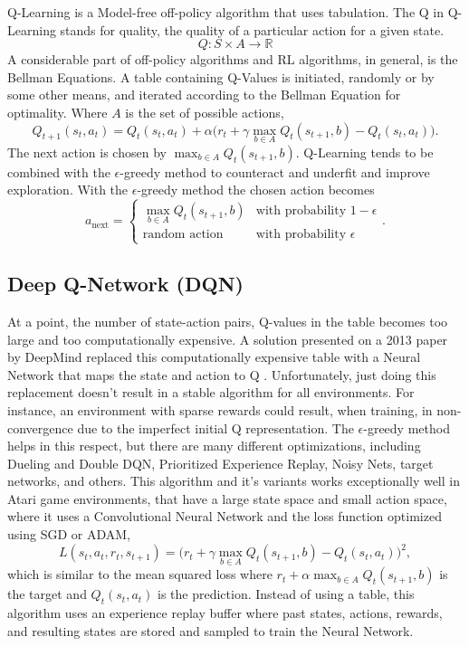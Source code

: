 Q-Learning is a Model-free off-policy algorithm that uses tabulation. The Q in Q-Learning stands for quality, the quality of a particular action for a given state. $$Q:S\times A\rightarrow \mathbb{R}$$ A considerable part of off-policy algorithms and RL algorithms, in general, is the Bellman Equations. A table containing Q-Values is initiated, randomly or by some other means, and iterated according to the Bellman Equation for optimality. Where $A$ is the set of possible actions, 
\begin{equation}\label{eq:qupdate}
	Q_{t+1}(s_t, a_t)=Q_t(s_t, a_t)+\alpha \big(r_t+\gamma\max_{b\in A} Q_t(s_{t+1},b)-Q_t(s_t,a_t)\big).
\end{equation}
 The next action is chosen by $\max_{b\in A} Q_t(s_{t+1},b)$. Q-Learning tends to be combined with the $\epsilon$-greedy method to counteract and underfit and improve exploration. With the $\epsilon$-greedy method the chosen action becomes $$a_{\text{next}}=\begin{cases}\max_{b\in A} Q_t(s_{t+1},b) & \text{with probability }1-\epsilon \\ \text{random action}  & \text{with probability }\epsilon\end{cases}.$$

\subsection{Deep Q-Network (DQN)}\label{subsec:DQN}

At a point, the number of state-action pairs, Q-values in the table becomes too large and too computationally expensive. A solution presented on a 2013 paper by DeepMind replaced this computationally expensive table with a Neural Network that maps the state and action to Q \cite{mnih_kavukcuoglu_silver_graves_antonoglou_wierstra_riedmiller_2013}. Unfortunately, just doing this replacement doesn't result in a stable algorithm for all environments. For instance, an environment with sparse rewards could result, when training, in non-convergence due to the imperfect initial Q representation. The $\epsilon$-greedy method helps in this respect, but there are many different optimizations, including Dueling and Double DQN, Prioritized Experience Replay, Noisy Nets, target networks, and others. This algorithm and it's variants works exceptionally well in Atari game environments, that have a large state space and small action space, where it uses a Convolutional Neural Network and the loss function optimized using SGD or ADAM, 
\begin{equation}\label{eq:dqnloss}
	L(s_t, a_t, r_t, s_{t+1})=\big(r_t+\gamma\max_{b\in A} Q_t(s_{t+1},b)-Q_t(s_t,a_t)\big)^2,
\end{equation} 
which is similar to the mean squared loss where $r_t+\alpha\max_{b\in A} Q_t(s_{t+1},b)$ is the target and $Q_t(s_t,a_t)$ is the prediction. Instead of using a table, this algorithm uses an experience replay buffer where past states, actions, rewards, and resulting states are stored and sampled to train the Neural Network.

